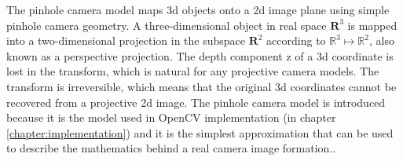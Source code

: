 \documentclass[12pt,a4paper,oneside,pdftex]{report}
\begin{document}
{The pinhole camera model maps 3d objects onto a 2d image plane using simple pinhole camera geometry. A three-dimensional object in real space $\mathbf{R}^3$ is mapped into a two-dimensional projection in the subspace $\mathbf{R}^2$ according to $\mathbb{R}^3 \mapsto \mathbb{R}^2$, also known as a perspective projection. The depth component z of a 3d coordinate is lost in the transform, which is natural for any projective camera models. The transform is irreversible, which means that the original 3d coordinates cannot be recovered from a projective 2d image. The pinhole camera model is introduced because it is the model used in OpenCV implementation (in chapter \ref{chapter:implementation}) and it is the simplest approximation that can be used to describe the mathematics behind a real camera image formation.\citep{Sonka07, OpenCVWeb}.


}
\end{document}
